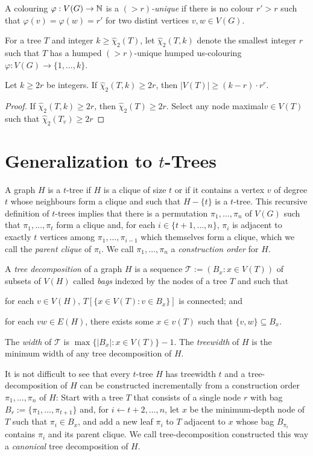 \documentclass[kpfonts]{patmorin}
\newcommand{\hus}{\hat{\chi}_2}
\begin{document}
A colouring $\varphi:V(G)\to\mathbb{N}$ is a \emph{$(>r)$-unique} if there is no colour $r'>r$ such that $\varphi(v)=\varphi(w)=r'$ for two distint vertices $v,w\in V(G)$.

For a tree $T$ and integer $k\ge \hus(T)$, let $\hus(T,k)$ denote the smallest integer $r$ such that $T$ has a humped $(>r)$-unique humped us-colouring $\varphi:V(G)\to\{1,\ldots,k\}$.

\begin{lem}
    Let $k\ge 2r$ be integers.
    If $\hus(T,k)\ge 2r$, then $|V(T)|\ge (k-r)\cdot r^r$.
\end{lem}

\begin{proof}
    If $\hus(T,k)\ge 2r$, then $\hus(T)\ge 2r$.
    Select any node maximal$v\in V(T)$ such that $\hus(T_v) \ge 2r$
\end{proof}




\section{Generalization to $t$-Trees}

A graph $H$ is a $t$-tree if $H$ is a clique of size $t$ or if it contains a vertex $v$ of degree $t$ whose neighbours form a clique and such that $H-\{t\}$ is a $t$-tree.  This recursive definition of $t$-trees implies that there is a permutation $\pi_1,\ldots,\pi_n$ of $V(G)$ such that $\pi_1,\ldots,\pi_t$ form a clique and, for each $i\in\{t+1,\ldots,n\}$, $\pi_i$ is adjacent to exactly $t$ vertices among $\pi_1,\ldots,\pi_{i-1}$ which themselves form a clique, which we call the \emph{parent clique} of $\pi_i$.  We call $\pi_1,\ldots,\pi_n$ a \emph{construction order} for $H$.

A \emph{tree decomposition} of a graph $H$ is a sequence $\mathcal{T}:=(B_x:x\in V(T))$ of subsets of $V(H)$ called \emph{bags} indexed by the nodes of a tree $T$ and such that
\begin{inparaenum}[(i)]
    \item for each $v\in V(H)$, $T[\{x\in V(T):v\in B_x\}]$ is connected; and
    \item for each $vw\in E(H)$, there exists some $x\in v(T)$ such that $\{v,w\}\subseteq B_x$.
\end{inparaenum}
The \emph{width} of $\mathcal{T}$ is $\max\{|B_x|:x\in V(T)\}-1$. The \emph{treewidth} of $H$ is the minimum width of any tree decomposition of $H$.

It is not difficult to see that every $t$-tree $H$ has treewidth $t$ and a tree-decomposition of $H$ can be constructed incrementally from a construction order $\pi_1,\ldots,\pi_n$ of $H$: Start with a tree $T$ that consists of a single node $r$ with bag $B_r:=\{\pi_1,\ldots,\pi_{t+1}\}$ and, for $i\gets t+2,\ldots,n$, let $x$ be the minimum-depth node of $T$ such that $\pi_i\in B_x$, and add a new leaf $\pi_i$ to $T$ adjacent to $x$ whose bag $B_{\pi_i}$ contains $\pi_i$ and its parent clique.  We call tree-decomposition constructed this way a \emph{canonical} tree decomposition of $H$.
\end{document}
